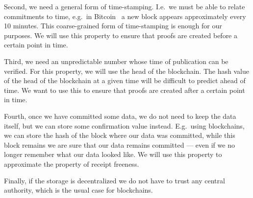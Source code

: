 Second, we need a general form of time-stamping.
I.e.\ we must be able to relate commitments to time, e.g.\ in 
Bitcoin~\cite{Bitcoin} a new block appears approximately every 10 minutes.
This coarse-grained form of time-stamping is enough for our purposes.
We will use this property to ensure that proofs are created before a certain 
point in time.

Third, we need an unpredictable number whose time of publication can be 
verified.
For this property, we will use the head of the blockchain.
The hash value of the head of the blockchain at a given time will be difficult 
to predict ahead of time.
We want to use this to ensure that proofs are created after a certain point in 
time.

Fourth, once we have committed some data, we do not need to keep the data 
itself, but we can store some confirmation value instead.
E.g.\ using blockchains, we can store the hash of the block where our data was 
committed, while this block remains we are sure that our data remains committed 
--- even if we no longer remember what our data looked like.
We will use this property to approximate the property of receipt freeness.

Finally, if the storage is decentralized we do not have to trust any central 
authority, which is the usual case for blockchains.
